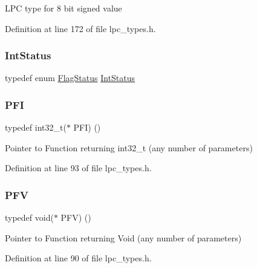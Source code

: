 L\+PC type for 8 bit signed value 

Definition at line 172 of file lpc\+\_\+types.\+h.

\mbox{\label{group___l_p_c___types___public___types_gab7d263072f745b4f3913fb0afc434c4e}} 
\subsubsection{\texorpdfstring{Int\+Status}{IntStatus}}
{\footnotesize\ttfamily typedef  enum \hyperlink{group___l_p_c___types___public___types_ga89136caac2e14c55151f527ac02daaff}{Flag\+Status}  \hyperlink{group___l_p_c___types___public___types_gab7d263072f745b4f3913fb0afc434c4e}{Int\+Status}}

\mbox{\label{group___l_p_c___types___public___types_ga5cad251913e41ad7a8c765945356ec47}} 
\subsubsection{\texorpdfstring{P\+FI}{PFI}}
{\footnotesize\ttfamily typedef int32\+\_\+t($\ast$ P\+FI) ()}

Pointer to Function returning int32\+\_\+t (any number of parameters) 

Definition at line 93 of file lpc\+\_\+types.\+h.

\mbox{\label{group___l_p_c___types___public___types_ga5f7b826e88ffb1fae2260abb3a75b19a}} 
\subsubsection{\texorpdfstring{P\+FV}{PFV}}
{\footnotesize\ttfamily typedef void($\ast$ P\+FV) ()}

Pointer to Function returning Void (any number of parameters) 

Definition at line 90 of file lpc\+\_\+types.\+h.

